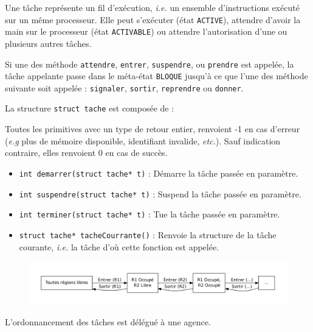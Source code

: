 {
Une tâche représente un fil d'exécution, \textsl{i.e.} un ensemble d'instructions exécuté sur un même processeur. Elle peut s'exécuter (état \lstinline{ACTIVE}), attendre d'avoir la main sur le processeur (état \lstinline{ACTIVABLE}) ou attendre l'autorisation d'une ou plusieurs autres tâches. 

Si une des méthode \lstinline{attendre}, \lstinline{entrer}, \lstinline{suspendre}, ou \lstinline{prendre} est appelée, la tâche appelante passe dans le méta-état \lstinline{BLOQUE} jusqu'à ce que l'une des méthode suivante soit appelée : \lstinline{signaler}, \lstinline{sortir}, \lstinline{reprendre} ou \lstinline{donner}.
}
{
La structure \lstinline{struct tache} est composée de :
}
{
Toutes les primitives avec un type de retour entier, renvoient -1 en cas d'erreur (\textsl{e.g} plus de mémoire disponible, identifiant invalide, \textsl{etc.}). Sauf indication contraire, elles renvoient 0 en cas de succès.

\begin{itemize}
	\item \lstinline{int demarrer(struct tache* t)} : Démarre la tâche passée en paramètre.
	\item \lstinline{int suspendre(struct tache* t)} : Suspend la tâche passée en paramètre. 
	\item \lstinline{int terminer(struct tache* t)} : Tue la tâche passée en paramètre.
	\item \lstinline{struct tache* tacheCourrante()} : Renvoie la structure de la tâche courante, \textsl{i.e.} la tâche d'où cette fonction est appelée.
\end{itemize}
}
{
\begin{figure} [htp]
\centering
\includegraphics[width=\textwidth]{img/etatTache.pdf}
\end{figure}
}
{L'ordonnancement des tâches est délégué à une agence.}
